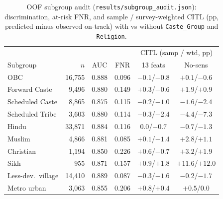 \documentclass[conference]{IEEEtran}
\begin{document}
\begin{table}[t]
    \centering
    \caption{OOF subgroup audit (\texttt{results/subgroup\_audit.json}): discrimination, at-risk FNR, and sample / survey-weighted CITL (pp, predicted minus observed on-track) with vs without \texttt{Caste\_Group} and \texttt{Religion}.}
    \label{tab:subgroups}
    \footnotesize
    \setlength{\tabcolsep}{2.5pt}
    \begin{tabular}{l r c c c c}
        \toprule
        & & & & \multicolumn{2}{c}{CITL (samp / wtd, pp)} \\
        Subgroup & $n$ & AUC & FNR & 13 feats & No-sens \\
        \midrule
        OBC & 16,755 & 0.888 & 0.096 & $-0.1$/$-0.8$ & $+0.1$/$-0.6$ \\
        Forward Caste & 9,496 & 0.880 & 0.149 & $+0.3$/$-0.6$ & $+1.9$/$+0.9$ \\
        Scheduled Caste & 8,865 & 0.875 & 0.115 & $-0.2$/$-1.0$ & $-1.6$/$-2.4$ \\
        Scheduled Tribe & 3,603 & 0.880 & 0.114 & $-0.3$/$-2.4$ & $-4.4$/$-7.3$ \\
        \midrule
        Hindu & 33,871 & 0.884 & 0.116 & $0.0$/$-0.7$ & $-0.7$/$-1.3$ \\
        Muslim & 4,866 & 0.881 & 0.085 & $+0.1$/$-1.4$ & $+2.8$/$+1.1$ \\
        Christian & 1,194 & 0.850 & 0.226 & $+0.6$/$-0.7$ & $+3.2$/$+1.9$ \\
        Sikh & 955 & 0.871 & 0.157 & $+0.9$/$+1.8$ & $+11.6$/$+12.0$ \\
        \midrule
        Less-dev.\ village & 14,410 & 0.889 & 0.087 & $-0.3$/$-1.6$ & $-0.2$/$-1.7$ \\
        Metro urban & 3,063 & 0.855 & 0.206 & $+0.8$/$+0.4$ & $+0.5$/$0.0$ \\
        \bottomrule
    \end{tabular}
\end{table}
\end{document}
